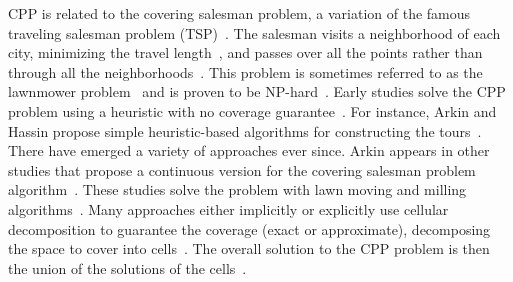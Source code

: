 CPP is related to the covering salesman problem, a variation of the famous traveling salesman problem (TSP)~\citep{arkin1994approximation}. The salesman visits a neighborhood of each city, minimizing the travel length~\citep{arkin1994approximation}, and passes over all the points rather than through all the neighborhoods~\citep{choset2001coverage}. This problem is sometimes referred to as the lawnmower problem~\citep{galceran2013survey} and is proven to be NP-hard~\citep{arkin2000approximation}. Early studies solve the CPP problem using a heuristic with no coverage guarantee~\citep{choset2001coverage}. For instance, Arkin and Hassin propose simple heuristic-based algorithms for constructing the tours~\citep{arkin1994approximation}. There have emerged a variety of approaches ever since. Arkin appears in other studies that propose a continuous version for the covering salesman problem algorithm~\citep{arkin1993lawnmower,fekete1994lawnmower,arkin2000approximation}. These studies solve the problem with lawn moving and milling algorithms~\citep{arkin2000approximation}. Many approaches either implicitly or explicitly use cellular decomposition to guarantee the coverage (exact or approximate), decomposing the space to cover into cells~\citep{choset2001coverage}. The overall solution to the CPP problem is then the union of the solutions of the cells~\citep{choset2001coverage}. 

